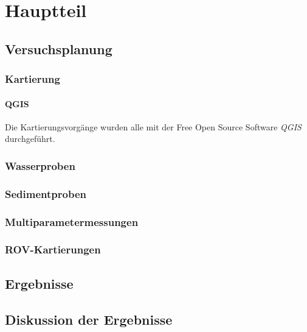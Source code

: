  

\chapter[Hauptteil]{Hauptteil}

\section{Versuchsplanung}

\subsection{Kartierung}
    \subsubsection*{QGIS}
    Die Kartierungsvorgänge wurden alle mit der Free Open Source Software \emph{QGIS}\cite{qgis} durchgeführt.
    
\subsection{Wasserproben}
\subsection{Sedimentproben}
\subsection{Multiparametermessungen}
\subsection{ROV-Kartierungen}

\section{Ergebnisse}
\section{Diskussion der Ergebnisse}

